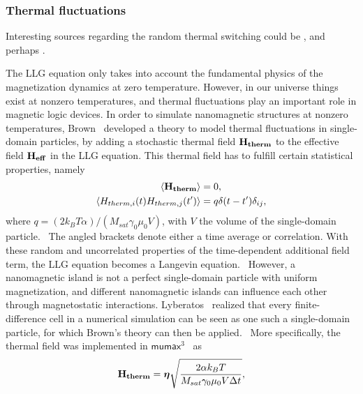 \documentclass[11pt,a4paper,english]{article}
\renewcommand{\vec}[1]{\boldsymbol{#1}}
\newcommand{\mumax}{$\mathsf{mumax}^3$}
\begin{document}
\subsubsection{Thermal fluctuations}
Interesting sources regarding the random thermal switching could be \cite{RandomSwitch_MonteCarlo, Nonmonotonic_reversal}, and perhaps \cite{MagDynamics_JumpNoise}. \par
The LLG equation only takes into account the fundamental physics of the magnetization dynamics at zero temperature. However, in our universe things exist at nonzero temperatures, and thermal fluctuations play an important role in magnetic logic devices. %
In order to simulate nanomagnetic structures at nonzero temperatures, Brown~\cite{ThermFluc_SingleDomain} developed a theory to model thermal fluctuations in single-domain particles, by adding a stochastic thermal field $\vb{H_{therm}}$ to the effective field $\vb{H_{eff}}$ in the LLG equation. This thermal field has to fulfill certain statistical properties, namely
\begin{align*}
    \langle \vb{H_{therm}} \rangle &= 0 \mathrm{,} \\
    \langle H_{therm,i}(t) H_{therm,j}(t') \rangle &= q \delta(t-t') \delta_{ij} \mathrm{,}
\end{align*}
where $q=(2 k_B T \alpha)/(M_{sat} \gamma_0 \mu_0 V)$, with $V$ the volume of the single-domain particle.~\cite{phd_leliaert} The angled brackets denote either a time average or correlation. With these random and uncorrelated properties of the time-dependent additional field term, the LLG equation becomes a Langevin equation.~\cite{ThermFluc_SingleDomain} However, a nanomagnetic island is not a perfect single-domain particle with uniform magnetization, and different nanomagnetic islands can influence each other through magnetostatic interactions.
Lyberatos~\cite{Lyberatos_1993} realized that every finite-difference cell in a numerical simulation can be seen as one such a single-domain particle, for which Brown's theory can then be applied.~\cite{phd_leliaert} More specifically, the thermal field was implemented in \mumax{}~\cite{LEL-17b,MuMax3} as
\begin{equation}
    \vb{H_{therm}} = \vec{\eta} \sqrt{\frac{2 \alpha k_B T}{M_{sat} \gamma_0 \mu_0 V \Delta t}} \mathrm{,}
    \label{eq:H_therm}
\end{equation}
\end{document}
